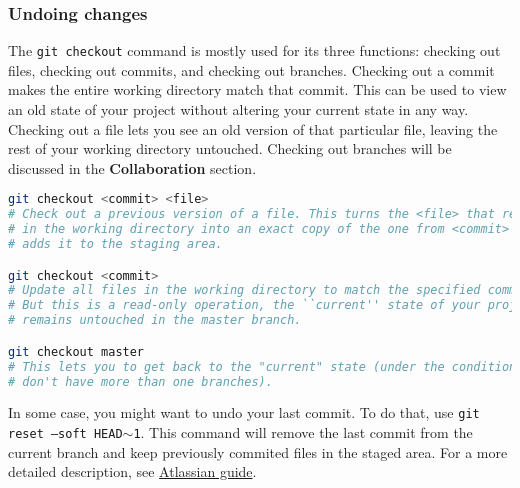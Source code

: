 \subsubsection{Undoing changes}
The \texttt{git checkout} command is mostly used for its three functions:
checking out files, checking out commits, and checking out branches.
Checking out a commit makes the entire working directory match that commit.
This can be used to view an old state of your project without altering your current state in any way.
Checking out a file lets you see an old version of that particular file, leaving the rest of your working directory untouched.
Checking out branches will be discussed in the \textbf{Collaboration} section.
\\
\begin{lstlisting}[language=bash]
git checkout <commit> <file>
# Check out a previous version of a file. This turns the <file> that resides
# in the working directory into an exact copy of the one from <commit> and
# adds it to the staging area.

git checkout <commit>
# Update all files in the working directory to match the specified commit.
# But this is a read-only operation, the ``current'' state of your project
# remains untouched in the master branch.

git checkout master
# This lets you to get back to the "current" state (under the condition you
# don't have more than one branches).
\end{lstlisting}

In some case, you might want to undo your last commit.
To do that, use \texttt{git reset --soft HEAD\texttt{$\sim$}1}.
This command will remove the last commit from the current branch and keep previously commited files in the staged area.
For a more detailed description, see \href{https://www.atlassian.com/git/tutorials/undoing-changes/git-reset}{Atlassian guide}.
